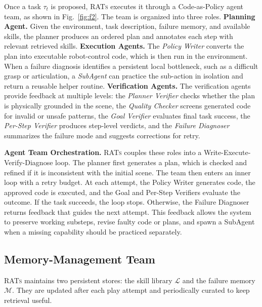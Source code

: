 \documentclass{llmxive}
\begin{document}
Once a task $\tau_t$ is proposed, \textsc{RATs} executes it through a Code-as-Policy agent team, as shown in Fig.~\ref{fig:f2}. The team is organized into three roles. 
\textbf{Planning Agent.} Given the environment, task description, failure memory, and available skills, the planner produces an ordered plan and annotates each step with relevant retrieved skills. 
\textbf{Execution Agents.} The \textit{Policy Writer} converts the plan into executable robot-control code, which is then run in the environment. When a failure diagnosis identifies a persistent local bottleneck, such as a difficult grasp or articulation, a \textit{SubAgent} can practice the sub-action in isolation and return a reusable helper routine. 
\textbf{Verification Agents.} The verification agents provide feedback at multiple levels: the \textit{Planner Verifier} checks whether the plan is physically grounded in the scene, the \textit{Quality Checker} screens generated code for invalid or unsafe patterns, the \textit{Goal Verifier} evaluates final task success, the \textit{Per-Step Verifier} produces step-level verdicts, and the \textit{Failure Diagnoser} summarizes the failure mode and suggests corrections for retry.

\textbf{Agent Team Orchestration.}
\textsc{RATs} couples these roles into a Write-Execute-Verify-Diagnose loop. The planner first generates a plan, which is checked and refined if it is inconsistent with the initial scene. The team then enters an inner loop with a retry budget. At each attempt, the Policy Writer generates code, the approved code is executed, and the Goal and Per-Step Verifiers evaluate the outcome. If the task succeeds, the loop stops. Otherwise, the Failure Diagnoser returns feedback that guides the next attempt. This feedback allows the system to preserve working substeps, revise faulty code or plans, and spawn a SubAgent when a missing capability should be practiced separately.











\subsection{Memory-Management Team}
\label{sec:updates}

\textsc{RATs} maintains two persistent stores: the skill library $\mathcal{L}$ and the failure memory $\mathcal{M}$. They are updated after each play attempt and periodically curated to keep retrieval useful.
\end{document}
